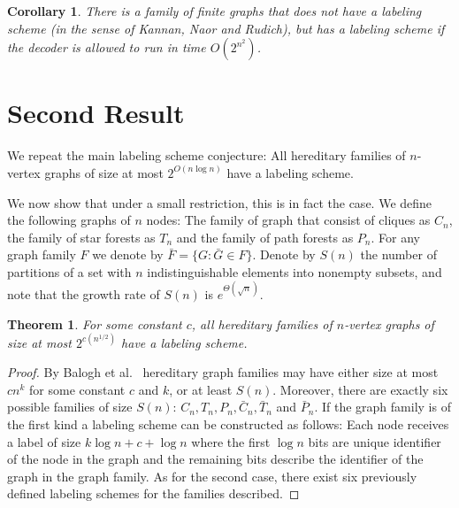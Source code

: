 \documentclass{article}
\newtheorem{theorem}{Theorem}
\newtheorem{corollary}{Corollary}
\begin{document}
\begin{corollary}
There is a family of finite graphs that does not have a labeling scheme (in the sense of Kannan, Naor and Rudich),
but has a labeling scheme if the decoder is allowed to run in time $O(2^{n^2})$.
\end{corollary}

\section{Second Result}
We repeat the main labeling scheme conjecture:
All hereditary families of $n$-vertex graphs  of size at most $2^{O(n \log n)}$ have a labeling scheme.

We now show that under a small restriction, this is in fact the case.
We define the following graphs of $n$ nodes:
The  family of graph that consist of cliques as $C_n$, the family of star forests as $T_n$ and the family of path forests as $P_n$.
For any graph family $F$ we denote by $\bar{F}= \{G: \bar{G}\in F \}$.
Denote by $S(n)$ the number of partitions of a set with $n$ indistinguishable elements into nonempty subsets, and 
note that the growth rate of $S(n)$ is $e^{\Theta(\sqrt{n})}$.
\begin{theorem}
For some constant $c$, all hereditary families of $n$-vertex graphs  of size at most $2^{c(n^{1/2})}$ have a labeling scheme.
\end{theorem}
\begin{proof}
By Balogh et al.~\cite{} hereditary graph families may have either size at most  $c n^k$  for some constant $c$ and $k$, or at least $S(n)$.
Moreover, there are exactly six possible families  of size $S(n)$: $C_n,T_n,P_n,\bar{C}_n,\bar{T}_n$ and $\bar{P}_n$.
If the graph family is of the first kind a labeling scheme can be constructed as follows:
Each node receives a label of size $k \log n +c+\log n$ where the first $\log n$ bits are unique identifier of the node in the graph and the remaining bits describe the identifier of the graph in the graph family. 
As for the second case, there exist six previously defined labeling schemes for the families described.
\end{proof}
\end{document}

